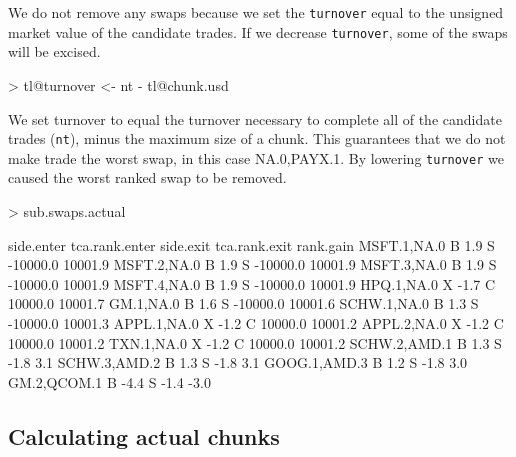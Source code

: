 \documentclass{article}
\begin{document}
We do not remove any swaps because we set the \texttt{turnover} equal
to the unsigned market value of the candidate trades.  If we
decrease \texttt{turnover}, some of the swaps will be excised.


\begin{Schunk}
\begin{Sinput}
> tl@turnover <- nt - tl@chunk.usd
\end{Sinput}
\end{Schunk}

We set turnover to equal the turnover necessary to complete all of the
candidate trades (\texttt{nt}), minus the maximum size of a chunk.
This guarantees that we do not make trade the worst swap, in this case
NA.0,PAYX.1.  By lowering
\texttt{turnover} we caused the worst ranked swap to be removed.



\begin{Schunk}
\begin{Sinput}
> sub.swaps.actual
\end{Sinput}
\begin{Soutput}
             side.enter tca.rank.enter side.exit tca.rank.exit rank.gain
MSFT.1,NA.0           B            1.9         S      -10000.0   10001.9
MSFT.2,NA.0           B            1.9         S      -10000.0   10001.9
MSFT.3,NA.0           B            1.9         S      -10000.0   10001.9
MSFT.4,NA.0           B            1.9         S      -10000.0   10001.9
HPQ.1,NA.0            X           -1.7         C       10000.0   10001.7
GM.1,NA.0             B            1.6         S      -10000.0   10001.6
SCHW.1,NA.0           B            1.3         S      -10000.0   10001.3
APPL.1,NA.0           X           -1.2         C       10000.0   10001.2
APPL.2,NA.0           X           -1.2         C       10000.0   10001.2
TXN.1,NA.0            X           -1.2         C       10000.0   10001.2
SCHW.2,AMD.1          B            1.3         S          -1.8       3.1
SCHW.3,AMD.2          B            1.3         S          -1.8       3.1
GOOG.1,AMD.3          B            1.2         S          -1.8       3.0
GM.2,QCOM.1           B           -4.4         S          -1.4      -3.0
\end{Soutput}
\end{Schunk}




\subsection{Calculating actual chunks}
\end{document}
